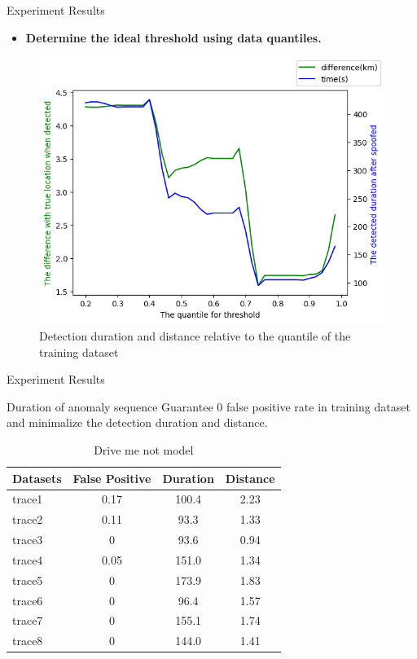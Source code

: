 \documentclass[aspectratio=169, 8pt]{beamer}
\begin{document}
\begin{frame}{Experiment Results}

\begin{itemize}
    \item \textbf{\large{Determine the ideal threshold using data quantiles.}}
 
\end{itemize}
\begin{figure}[h]
  \centering
  \includegraphics[width=0.55\linewidth]{images/quantile.png}
  \caption{Detection duration and distance relative to the quantile of the training dataset}
  \Description{}
  \label{quantile}
\end{figure}

\end{frame}


\begin{frame}{Experiment Results}
\begin{block}{Duration of anomaly sequence}
Guarantee 0 false positive rate in training dataset and minimalize the detection duration and distance.
\end{block}
\begin{table}[h]
    \centering
    \begin{tabular}{lccc}
        \toprule
        \textbf{Datasets} & \textbf{False Positive} & \textbf{Duration} & \textbf{Distance} \\
        \midrule
        trace1  & 0.17  & 100.4 & 2.23 \\
        trace2  & 0.11  & 93.3 & 1.33 \\
        trace3  & 0   & 93.6 & 0.94 \\
        trace4  & 0.05   & 151.0 & 1.34 \\
        trace5  & 0  & 173.9 & 1.83 \\
        trace6  & 0  & 96.4 & 1.57 \\
        trace7  & 0  & 155.1 & 1.74 \\
        trace8  & 0  & 144.0 & 1.41 \\
        \bottomrule
    \end{tabular}
    \caption{Drive me not model}
    \label{tab:dmn}
\end{table}

    
\end{frame}
\end{document}
